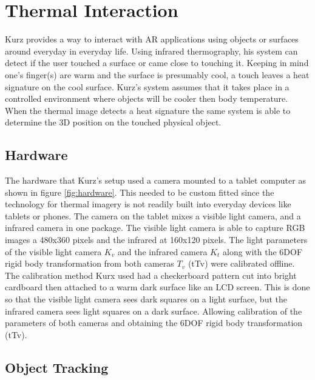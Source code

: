\documentclass{sig-alternate}
\begin{document}
\section{Thermal Interaction}
\label{sec:Thermal Interaction}

Kurz \cite{Thermal} provides a way to interact with AR applications using objects or surfaces around everyday in everyday life. Using infrared thermography, his system can detect if the user touched a surface or came close to touching it. Keeping in mind one's finger(s) are warm and the surface is presumably cool, a touch leaves a heat signature on the cool surface. Kurz's system assumes that it takes place in a controlled environment where objects will be cooler then body temperature. When the thermal image detects a heat signature the same system is able to determine the 3D position on the touched physical object. 


\subsection{Hardware}
\label{Hardware}

The hardware that Kurz's \cite{Thermal} setup used a camera mounted to a tablet computer as shown in figure \ref{fig:hardware}. This needed to be custom fitted since the technology for thermal imagery is not readily built into everyday devices like tablets or phones. The camera on the tablet mixes a visible light camera, and a infrared camera in one package. The visible light camera is able to capture RGB images a 480x360 pixels and the infrared at 160x120 pixels. The light parameters of the visible light camera \(K_v\) and the infrared camera \(K_t\) along with the 6DOF rigid body transformation from both cameras \(T_v\) (tTv) were calibrated offline. The calibration method Kurx used had a checkerboard pattern cut into bright cardboard then attached to a warm dark surface like an LCD screen. This is done so that the visible light camera sees dark squares on a light surface, but the infrared camera sees light squares on a dark surface. Allowing calibration of the parameters of both cameras and obtaining the 6DOF rigid body transformation (tTv).



\subsection{Object Tracking}
\label{Object Tracking}
\end{document}
